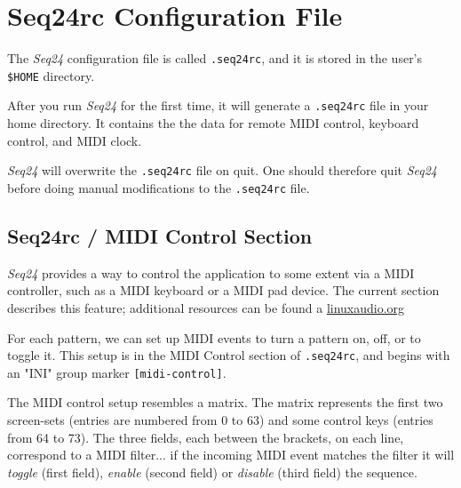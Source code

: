 %
%
%

\section{Seq24rc Configuration File}
\label{sec:seq24_rc_file}

   \index{[.seq24rc]}   %
   The \textsl{Seq24} configuration file is called
   \texttt{.seq24rc}, and it is stored in the user's \texttt{\$HOME}
   directory.

   After you run \textsl{Seq24} for the first time, it will generate a
   \texttt{.seq24rc} file in your home directory.
   It contains the the data for remote MIDI control, keyboard
   control, and MIDI clock.

   \textsl{Seq24} will overwrite the \texttt{.seq24rc} file on quit.  One
   should therefore quit \textsl{Seq24} before doing manual modifications
   to the \texttt{.seq24rc} file.

\subsection{Seq24rc / MIDI Control Section}
\label{subsec:seq24_rc_file_midi_control}

   \textsl{Seq24} provides a way to control the
   application to some extent via a MIDI controller, such as a MIDI keyboard or
   a MIDI pad device.  The current section describes this feature;
   additional resources can be found a \url{linuxaudio.org}

   For each pattern, we can set up MIDI events to turn a 
	pattern on, off, or to toggle it.  This setup is in the 
   MIDI Control section of \texttt{.seq24rc}, and begins with an
   "INI" group marker \texttt{[midi-control]}.

   The MIDI control setup resembles a matrix.
   The matrix represents the first two screen-sets
   (entries are numbered from 0
   to 63) and some control keys (entries from 64 to 73).  The three fields,
   each between the brackets, on each line, correspond to a MIDI filter... if
   the incoming MIDI event matches the filter it will \textsl{toggle} (first
   field), \textsl{enable} (second field) or \textsl{disable} (third field) the
   sequence.
	
